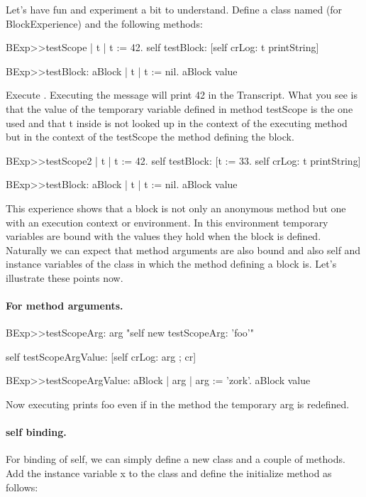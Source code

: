 \documentclass[a4paper,10pt,twoside]{book}
\begin{document}
Let's have fun and experiment a bit to understand. 
Define a class named  (for BlockExperience) and the following methods:

\begin{code}{}
BExp>>testScope 
	| t | 
	t := 42. 
	self testBlock: [self crLog: t printString] 
	
BExp>>testBlock: aBlock 
	| t | 
	t := nil. 
	aBlock value 
\end{code}

Execute . Executing the  message will print 42 in the Transcript. What you see is that the value of the temporary variable  defined in method testScope is the one used and that t inside  is not looked up in the context of the executing method  but in the context of the testScope the method defining the block.

\begin{code}{}
BExp>>testScope2 
	| t | 
	t := 42. 
	self testBlock: [t := 33.
					self crLog: t printString] 	
	
BExp>>testBlock: aBlock
	| t | 
	t := nil. 
	aBlock value 
\end{code}

This experience shows that a block is not only an anonymous method but one with an execution context or environment. In this environment temporary variables are bound with the values they hold when the block 
is defined. Naturally we can expect that method arguments are also bound and also self and instance variables of the class in which the method defining a block is. Let's illustrate these points now. 


\paragraph{For method arguments.}

\begin{code}{}
BExp>>testScopeArg: arg
	"self new testScopeArg: 'foo'"
	
	self testScopeArgValue: [self crLog: arg ; cr]

BExp>>testScopeArgValue: aBlock
	| arg | 
	arg := 'zork'.
	aBlock value
\end{code}

Now executing  prints foo even if in the method  the temporary arg is redefined.
 

\paragraph{self binding.}
For binding of self, we can simply define a new class and a couple of methods. 
Add the instance variable x to the class  and define the initialize method as follows:
\end{document}
